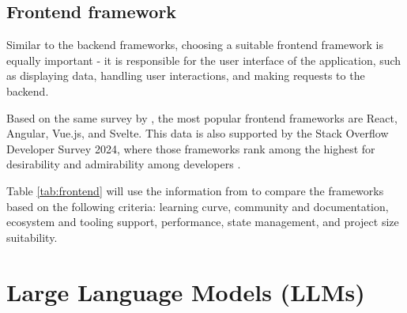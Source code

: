 \subsection{Frontend framework}

Similar to the backend frameworks, choosing a suitable frontend framework is equally important - it is responsible for the user interface of the application, such as displaying data, handling user interactions, and making requests to the backend. 

Based on the same survey by \textcite{statista-webframeworks}, the most popular frontend frameworks are React, Angular, Vue.js, and Svelte. This data is also supported by the Stack Overflow Developer Survey 2024, where those frameworks rank among the highest for desirability and admirability among developers \parencite{stackoverflow}.

Table \ref{tab:frontend} will use the information from \textcite{react,angular,vue,svelte} to compare the frameworks based on the following criteria: learning curve, community and documentation, ecosystem and tooling support, performance, state management, and project size suitability.

\begin{table}[h]
    \centering
    \caption{Comparison of frontend frameworks}
    \label{tab:frontend}
\end{table}

\section{Large Language Models (LLMs)}

